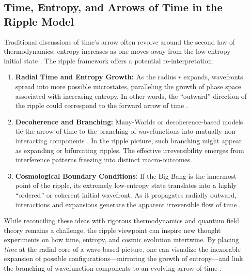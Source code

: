 \documentclass{article}
\begin{document}
\subsection{Time, Entropy, and Arrows of Time in the Ripple Model}
\label{subsec:time-entropy}
Traditional discussions of time’s arrow often revolve around the second 
law of thermodynamics: entropy increases as one moves away from the low-entropy 
initial state \cite{Penrose1979, carroll2010}. The ripple framework offers 
a potential re-interpretation:
\begin{enumerate}
  \item \textbf{Radial Time and Entropy Growth:} As the radius \(r\) 
        expands, wavefronts spread into more possible microstates, 
        paralleling the growth of phase space associated with increasing 
        entropy. In other words, the “outward” direction of the ripple 
        could correspond to the forward arrow of time \cite{hawking1988}.
  \item \textbf{Decoherence and Branching:} Many-Worlds or decoherence-based 
        models tie the arrow of time to the branching of wavefunctions into 
        mutually non-interacting components \cite{Zurek1982, everett1957}. 
        In the ripple picture, such branching might appear as expanding or 
        bifurcating ripples. The effective irreversibility emerges from 
        interference patterns freezing into distinct macro-outcomes.
  \item \textbf{Cosmological Boundary Conditions:} If the Big Bang is the 
        innermost point of the ripple, its extremely low-entropy state 
        translates into a highly “ordered” or coherent initial wavefront. 
        As it propagates radially outward, interactions and expansions 
        generate the apparent irreversible flow of time \cite{penrose2004}.
\end{enumerate}
While reconciling these ideas with rigorous thermodynamics and quantum 
field theory remains a challenge, the ripple viewpoint can inspire new 
thought experiments on how time, entropy, and cosmic evolution intertwine. 
By placing \emph{time} at the radial core of a wave-based picture, one 
can visualize the inexorable expansion of possible configurations—mirroring 
the growth of entropy—and link the branching of wavefunction components 
to an evolving arrow of time \cite{carroll2010, Zurek1982}.

\end{document}
